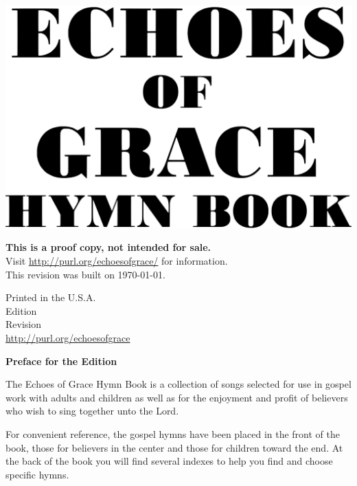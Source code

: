 \documentclass{book}
\renewcommand{\year}{\DTMfetchyear{now} }
\begin{document}

\vspace*{1in}

\noindent\hfil\includegraphics[scale=0.06]{booklayout/bodoni-scan}\hfil

\vfill

%
\begin{center}
\textbf{This is a proof copy, not intended for sale.} \\
Visit \url{http://purl.org/echoesofgrace/} for information.\\
This revision was built on \today.
\end{center}

\pagebreak

\vspace*{\fill}
\begin{center}
Printed in the U.S.A.\\
\year Edition\\
Revision \\
\url{http://purl.org/echoesofgrace}
\end{center}

\pagebreak


\vspace*{1.5in}
\noindent\hfil{\textbf{Preface for the \year Edition}}\hfil

The {\textit{}Echoes of Grace Hymn Book} is a collection of songs selected for
use in gospel work with adults and children as well as for the enjoyment and
profit of believers who wish to sing together unto the Lord.

For convenient reference, the gospel hymns have been placed in the front of the
book, those for believers in the center and those for children toward the end.
At the back of the book you will find several indexes to help you find and
choose specific hymns.
\end{document}
